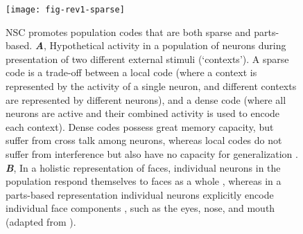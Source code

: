 \begin{figure}[b!]
	\centering
	\texttt{[image: fig-rev1-sparse]}
    \caption{\Acf{NSC} promotes population codes that are both sparse and parts-based.
    \textbf{\emph{A}},
    	   Hypothetical activity in a population of neurons
           during presentation of two different external stimuli (`contexts').
           A sparse code is a trade-off between a local code
           (where a context is represented by the activity of a single neuron,
           and different contexts are represented by different neurons), and a
           dense code (where all neurons are active and their combined activity is
           used to encode each context).
           Dense codes possess great memory capacity, but suffer from cross talk
           among neurons, whereas local codes do not suffer from interference
           but also have no capacity for generalization
           .
     \textbf{\emph{B}},
           In a holistic representation of faces, 
           individual neurons in the population
           respond themselves to faces as a whole \cite{TanakaFarah1993},
           whereas in a parts-based representation
           individual neurons explicitly encode individual face components
           \cite{Palmer1977},
           such as the eyes, nose, and mouth
           (adapted from \cite{LeeSeung1999} ).}
	\label{fig:sparse-parts}
\end{figure}

